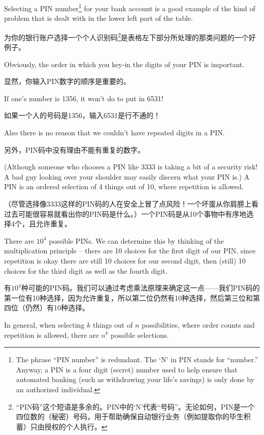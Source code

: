 
Selecting a PIN number\footnote{The phrase ``PIN number'' is 
redundant. The `N' in PIN stands for ``number.''  Anyway, a PIN is
a four digit (secret) number used to help ensure that automated banking
(such as withdrawing your life's savings) is only done by an authorized
individual.}   for your bank account is a good example of
the kind of problem that is dealt with in the lower left part of the
table.

为你的银行账户选择一个个人识别码\footnote{“PIN码”这个短语是多余的。PIN中的‘N’代表“号码”。无论如何，PIN是一个四位数的（秘密）号码，用于帮助确保自动银行业务（例如提取你的毕生积蓄）只由授权的个人执行。}是表格左下部分所处理的那类问题的一个好例子。

Obviously, the order in which you key-in the digits of your PIN
is important.

显然，你输入PIN数字的顺序是重要的。

If one's number is 1356, it won't do to put in 6531!

如果一个人的号码是1356，输入6531是行不通的！

Also there is no reason that we couldn't have repeated digits in a PIN.

另外，PIN码中没有理由不能有重复的数字。

(Although someone who chooses a PIN like 3333 is taking a bit of a security
risk!  A bad guy looking over your shoulder may easily discern what your
PIN is.)  A PIN is an ordered selection of 4 things out of 10, where 
repetition is allowed.

（尽管选择像3333这样的PIN码的人在安全上冒了点风险！一个坏蛋从你肩膀上看过去可能很容易就看出你的PIN码是什么。）一个PIN码是从10个事物中有序地选择4个，且允许重复。

There are $10^4$ possible PINs.  We can determine
this by thinking of the multiplication principle -- there are 10 choices 
for the first digit of our PIN, since repetition is okay there are still
10 choices for our second digit, then (still) 10 choices for the third
digit as well as the fourth digit.

有$10^4$种可能的PIN码。我们可以通过考虑乘法原理来确定这一点——我们PIN码的第一位有10种选择，因为允许重复，所以第二位仍然有10种选择，然后第三位和第四位（仍然）有10种选择。

In general, when selecting $k$ things out of $n$ possibilities, where order
counts and repetition is allowed, there are $n^k$ possible selections.

